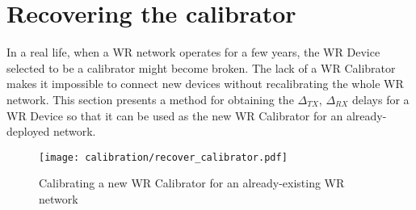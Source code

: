 \section{Recovering the calibrator}

In a real life, when a WR network operates for a few years, the WR Device selected
to be a calibrator might become broken. The lack of a WR Calibrator makes it
impossible to connect new devices without recalibrating the whole WR network.
This section presents a method for obtaining the $\Delta_{TX}$, $\Delta_{RX}$
delays for a WR Device so that it can be used as the new WR Calibrator for an
already-deployed network.

\begin{figure}[ht]
	\begin{center}
	\texttt{[image: calibration/recover\_calibrator.pdf]}
	\caption{Calibrating a new WR Calibrator for an already-existing WR network}
	\label{fig:recover_calibrator}
	\end{center}
\end{figure}

